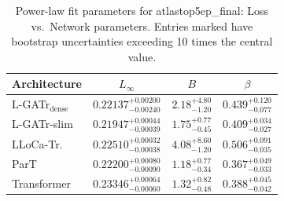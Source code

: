 \begin{table}[h]
  \centering
  \begin{tabular}{lccc}
    \toprule
    Architecture & $L_\infty$ & $B$ & $\beta$ \\
    \midrule
    L-GATr$_\mathrm{dense}$ & $0.22137^{+0.00200}_{-0.00240}$ & $2.18^{+4.80}_{-1.20}$ & $0.439^{+0.120}_{-0.077}$ \\
    L-GATr-slim & $0.21947^{+0.00044}_{-0.00039}$ & $1.75^{+0.77}_{-0.45}$ & $0.409^{+0.034}_{-0.027}$ \\
    LLoCa-Tr. & $0.22510^{+0.00032}_{-0.00038}$ & $4.08^{+8.60}_{-1.20}$ & $0.506^{+0.091}_{-0.035}$ \\
    ParT & $0.22200^{+0.00080}_{-0.00090}$ & $1.18^{+0.77}_{-0.34}$ & $0.367^{+0.049}_{-0.033}$ \\
    Transformer & $0.23346^{+0.00064}_{-0.00060}$ & $1.32^{+0.82}_{-0.48}$ & $0.388^{+0.045}_{-0.042}$ \\
    \bottomrule
  \end{tabular}
  \caption{Power-law fit parameters for atlastop5ep\_final: Loss vs.\ Network parameters. Entries marked \textemdash{} have bootstrap uncertainties exceeding 10 times the central value.}
  \label{tab:atlastop5ep_final}
\end{table}
